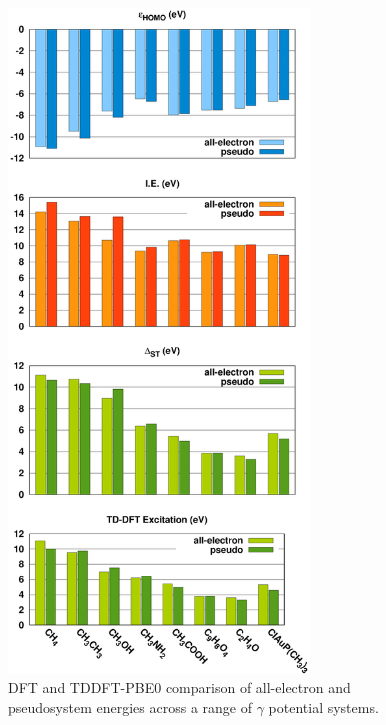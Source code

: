\documentclass[aip,reprint,nofootinbib]{revtex4-1}
\begin{document}
\begin{figure}
\begin{center}
\includegraphics[width=8cm]{gamma_pbe0}
\end{center}
\caption[Energy level results for $\gamma$ pseudopotentials.]{DFT and TDDFT-PBE0 comparison of all-electron and pseudosystem energies across a range of $\gamma$ potential systems.}\label{fig:gamma_graphs}
\end{figure}
\end{document}
